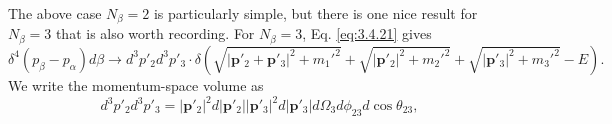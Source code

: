 The above case $N_\beta=2$ is particularly simple, but there is one nice result for $N_\beta=3$
that is also worth recording. For $N_\beta=3$, Eq. \eqref{eq:3.4.21} gives
\[
 \delta^4(p_\beta-p_\alpha)d\beta\longrightarrow d^3p'_2d^3p'_3
 \cdot\delta\left(\sqrt{|\mathbf{p}'_2+\mathbf{p}'_3|^2+m_1'^2}
 +\sqrt{|\mathbf{p}'_2|^2+m_2'^2}+\sqrt{|\mathbf{p}'_3|^2+m_3'^2}-E\right).
\]
We write the momentum-space volume as
\[
 d^3p'_2d^3p'_3=|\mathbf{p}'_2|^2d|\mathbf{p}'_2|
 |\mathbf{p}'_3|^2d|\mathbf{p}'_3|d\Omega_3d\phi_{23}d\cos\theta_{23},
\]
